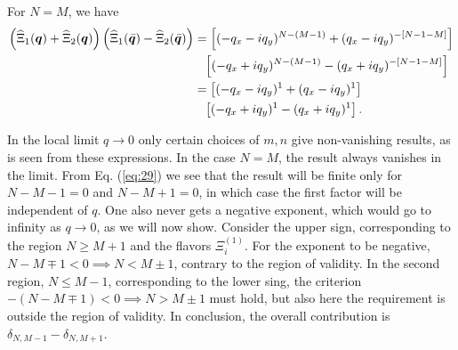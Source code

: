 For $N=M$, we have
\begin{equation}
  \begin{split}
    \left( \widehat{\Xi}_1 (\vec{q}) + \widehat{\Xi} _2(\vec{q}) \right)
    \left( \widehat{\Xi} _1(\bar{\vec{q}}) - \widehat{\Xi} _2(\bar{\vec{q}}) \right)
    &= 
    \left[
      (- q_x - iq_y) ^{N-(M-1)} + (q_x  - iq_y ) ^{-[N-1-M]}
    \right]\\
    &\pe \left[
      (-  q_x + iq_y) ^{N-(M-1)} - (q_x  + iq_y ) ^{-[N-1-M]}
    \right]\\
    &= \left[
      (- q_x - iq_y) ^{1} + (q_x  - iq_y ) ^{1}
    \right]\\
    &\pe \left[
      (-  q_x + iq_y) ^{1} - (q_x  + iq_y ) ^{1}
    \right].
  \end{split}
\end{equation}


In the local limit $q\to  0$ only certain choices of $m,n$ give non-vanishing results, as is seen from these expressions.
In the case $N=M$, the result always vanishes in the limit.
From Eq. (\ref{eq:29}) we see that the result will be finite only for $N-M-1 = 0$ and $N-M+1=0$, in which case the first factor will be independent of $q$.
One also never gets a negative exponent, which would go to infinity as $q \to 0$, as we will now show.
Consider the upper sign, corresponding to the region $N\geq M+1$ and the flavors $\Xi _i ^{(1)}$.
For the exponent to be negative, $N-M \mp 1 < 0 \implies  N < M \pm 1$, contrary to the region of validity.
In the second region, $N \leq M-1$, corresponding to the lower sing, the criterion $-(N-M \mp 1) < 0 \implies N> M \pm 1$ must hold, but also here the requirement is outside the region of validity.
In conclusion, the overall contribution is \( \delta _{N, M-1} - \delta _{N, M+1} \).

